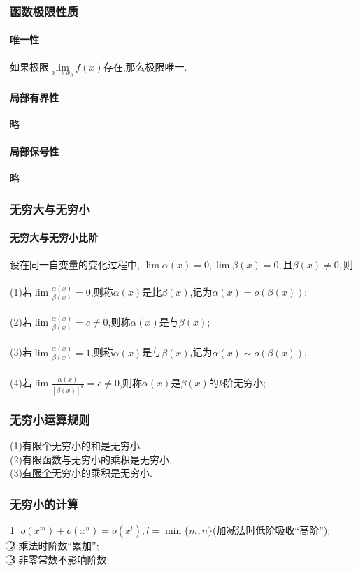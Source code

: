 \documentclass[10pt,a4paper,UTF8]{ctexart}
\begin{document}
\subsubsection{函数极限性质}
\paragraph{唯一性}如果极限$\lim\limits_{x\to x_0}{f(x)}$存在,那么极限唯一.
\paragraph{局部有界性} 略
\paragraph{局部保号性} 略
\subsubsection{无穷大与无穷小}
\paragraph{无穷大与无穷小比阶}设在同一自变量的变化过程中,
$\lim{\alpha(x)}=0,\lim{\beta(x)}=0,\textit{且}\beta(x)\neq 0,$则\\
\\
(1)若$\lim{\frac{\alpha(x)}{\beta(x)}}=0$,则称$\alpha(x)$是比$\beta(x)$,记为$\alpha(x)=o(\beta(x))$;\\
\\
(2)若$\lim{\frac{\alpha(x)}{\beta(x)}}=c\neq 0$,则称$\alpha(x)$是与$\beta(x)$;\\
\\
(3)若$\lim{\frac{\alpha(x)}{\beta(x)}}=1$,则称$\alpha(x)$是与$\beta(x)$,记为$\alpha(x)\sim o(\beta(x))$;\\
\\
(4)若$\lim{\frac{\alpha(x)}{[\beta(x)]^k}}=c\neq 0$,则称$\alpha(x)$是$\beta(x)$的$k$阶无穷小;%
\subsubsection{无穷小运算规则}
\noindent (1)有限个无穷小的和是无穷小.\\
(2)有限函数与无穷小的乘积是无穷小.\\
(3)\underline{有限个}无穷小的乘积是无穷小.
\subsubsection{无穷小的计算}
\noindent\textcircled{1} $o(x^m)+o(x^n)=o(x^l),l=\min\{m,n\}$(加减法时低阶吸收``高阶'');\\
\textcircled{2} 乘法时阶数``累加'';\\
\textcircled{3} 非零常数不影响阶数;
\end{document}
